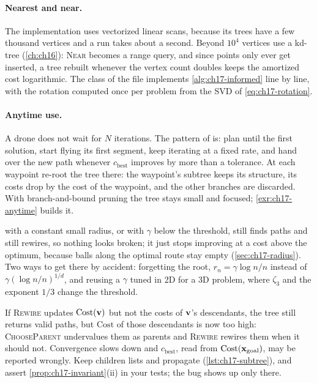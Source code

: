 \paragraph{Nearest and near.} The implementation uses vectorized linear
scans, because its trees have a few thousand vertices and a run takes about
a second. Beyond $10^4$ vertices use a kd-tree (\cref{ch:ch16}):
\textsc{Near} becomes a range query, and since points only ever get
inserted, a tree rebuilt whenever the vertex count doubles keeps the
amortized cost logarithmic. The class  of the file implements
\cref{alg:ch17-informed} line by line, with the rotation computed once per
problem from the SVD of \cref{eq:ch17-rotation}.


\paragraph{Anytime use.} A drone
does not wait for $N$ iterations. The pattern of
\textcite{karaman2011anytime} is: plan until the first solution, start
flying its first segment, keep iterating at a fixed rate, and hand over the
new path whenever $c_{\mathrm{best}}$ improves by more than a tolerance.
At each waypoint re-root the tree there: the waypoint's subtree keeps its
structure, its costs drop by the cost of the waypoint, and the other
branches are discarded. With branch-and-bound pruning the tree stays small
and focused; \cref{exr:ch17-anytime} builds it.

\begin{pitfall}
\rrtstar with a constant small radius, or with $\gamma$ below the
threshold, still finds paths and still rewires, so nothing looks broken;
it just stops improving at a cost above the optimum, because balls along
the optimal route stay empty (\cref{sec:ch17-radius}). Two ways to get
there by accident: forgetting the root, $r_n=\gamma\log n/n$ instead of
$\gamma(\log n/n)^{1/d}$, and reusing a $\gamma$ tuned in 2D for a 3D
problem, where $\zeta_3$ and the exponent $1/3$ change the threshold. 
\end{pitfall}

\begin{pitfall}
If \textsc{Rewire} updates $\mathrm{Cost}(\mathbf{v})$ but not the costs of $\mathbf{v}$'s
descendants, the tree still returns valid paths, but $\mathrm{Cost}$ of
those descendants is now too high: \textsc{ChooseParent} undervalues them
as parents and \textsc{Rewire} rewires them when it should not.
Convergence slows down and $c_{\mathrm{best}}$, read from
$\mathrm{Cost}(\mathbf{x}_{\mathrm{goal}})$, may be reported wrongly. Keep children
lists and propagate (\cref{lst:ch17-subtree}), and assert
\cref{prop:ch17-invariant}(ii) in your tests; the bug shows up only there.
\end{pitfall}

